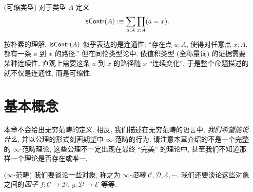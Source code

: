 \begin{definition}
	{(可缩类型)}
	对于类型 $A$ 定义
	\[
	\mathsf{isContr}(A) :\equiv \sum_{a : A} \prod_{x : A} (a=x).
	\]
\end{definition}

\begin{remark}
	{}
	按朴素的理解, $\mathsf{isContr}(A)$ 似乎表达的是连通性: ``存在点 $a:A$, 使得对任意点 $x:A$, 都有一条 $a$ 到 $x$ 的路径.''
	但在同伦类型论中, 依值积类型 (全称量词) 的证据需要某种连续性, 直观上需要这条 $a$ 到 $x$ 的路径随 $x$ ``连续变化'', 于是整个命题描述的就不仅是连通性, 而是可缩性.
\end{remark}

\section{基本概念}

本章不会给出无穷范畴的定义. 相反, 我们描述在无穷范畴的语言中, \emph{我们希望能说什么}, 并以公理的形式刻画期望中 $\infty$-范畴的行为. 请注意本章介绍的不是一个完整的 $\infty$-范畴理论, 这些公理不一定出现在最终 ``完美'' 的理论中, 甚至我们不知道那样一个理论是否存在或唯一.

\begin{axiom}
	{($\infty$-范畴)}
	我们要谈论一些对象, 称之为 \emph{$\infty$-范畴} $\mathcal C,\mathcal D,\mathcal E,\cdots$.
	我们还要谈论这些对象之间的\emph{函子} $f\colon \mathcal C\to \mathcal D$, $g\colon \mathcal D\to\mathcal E$ 等等.
\end{axiom}




